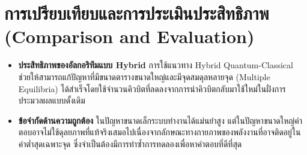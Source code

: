 \section{การเปรียบเทียบและการประเมินประสิทธิภาพ (Comparison and Evaluation)}
\begin{itemize}
    \item \textbf{ประสิทธิภาพของอัลกอริทึมแบบ Hybrid} การใช้แนวทาง Hybrid Quantum-Classical ช่วยให้สามารถแก้ปัญหาที่มีขนาดตารางขนาดใหญ่และมีจุดสมดุลหลายจุด (Multiple Equilibria) ได้สำเร็จโดยใช้จำนวนคิวบิตที่ลดลงจากการนำคิวบิตกลับมาใช้ใหม่ในฝั่งการประมวลผลแบบดั้งเดิม
    \item \textbf{ข้อจำกัดด้านความถูกต้อง} ในปัญหาขนาดเล็กระบบทำงานได้แม่นยำสูง แต่ในปัญหาขนาดใหญ่คำตอบอาจไม่ใช้ดุลยภาพที่แท้จริงเสมอไปเนื่องจากลักษณะทางกายภาพของพลังงานที่อาจติดอยู่ในค่าต่ำสุดเฉพาะจุด ซึ่งจำเป็นต้องมีการทำซ้ำการทดลองเพื่อหาคำตอบที่ดีที่สุด
\end{itemize}



